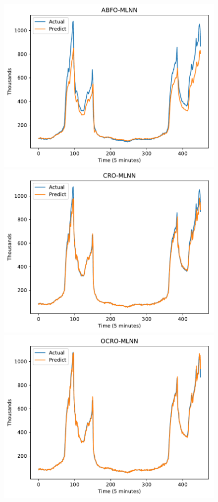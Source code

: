 \documentclass[11pt,twoside]{article}
\begin{document}
\begin{multicols}{2}
\begin{figure}[!ht]
  \begin{minipage}[b]{0.33\linewidth}
    \centering
    \includegraphics[width=0.9\linewidth]{images/pdf/predict/k5/wc_k5_abfo_mlnn.pdf} 
  \end{minipage}
  \begin{minipage}[b]{0.33\linewidth}
    \centering
    \includegraphics[width=0.9\linewidth]{images/pdf/predict/k5/wc_k5_cro_mlnn.pdf} 
  \end{minipage} 
  \begin{minipage}[b]{0.33\linewidth}
    \centering
    \includegraphics[width=0.9\linewidth]{images/pdf/predict/k5/wc_k5_ocro_mlnn.pdf} 

\end{minipage}
\end{figure}
\end{multicols}
\end{document}
